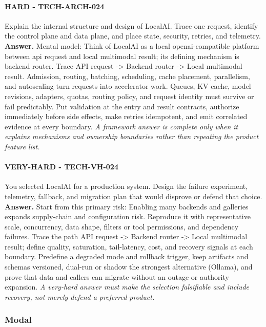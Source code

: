 \paragraph{HARD - TECH-ARCH-024} Explain the internal structure and design of LocalAI. Trace one request, identify the control plane and data plane, and place state, security, retries, and telemetry.
\textbf{Answer.} Mental model: Think of LocalAI as a local openai-compatible platform between api request and local multimodal result; its defining mechanism is backend router. Trace API request -> Backend router -> Local multimodal result. Admission, routing, batching, scheduling, cache placement, parallelism, and autoscaling turn requests into accelerator work. Queues, KV cache, model revisions, adapters, quotas, routing policy, and request identity must survive or fail predictably. Put validation at the entry and result contracts, authorize immediately before side effects, make retries idempotent, and emit correlated evidence at every boundary.
\textit{A framework answer is complete only when it explains mechanisms and ownership boundaries rather than repeating the product feature list.}
\paragraph{VERY-HARD - TECH-VH-024} You selected LocalAI for a production system. Design the failure experiment, telemetry, fallback, and migration plan that would disprove or defend that choice.
\textbf{Answer.} Start from this primary risk: Enabling many backends and galleries expands supply-chain and configuration risk. Reproduce it with representative scale, concurrency, data shape, filters or tool permissions, and dependency failures. Trace the path API request -> Backend router -> Local multimodal result; define quality, saturation, tail-latency, cost, and recovery signals at each boundary. Predefine a degraded mode and rollback trigger, keep artifacts and schemas versioned, dual-run or shadow the strongest alternative (Ollama), and prove that data and callers can migrate without an outage or authority expansion.
\textit{A very-hard answer must make the selection falsifiable and include recovery, not merely defend a preferred product.}
\subsubsection*{Modal}
